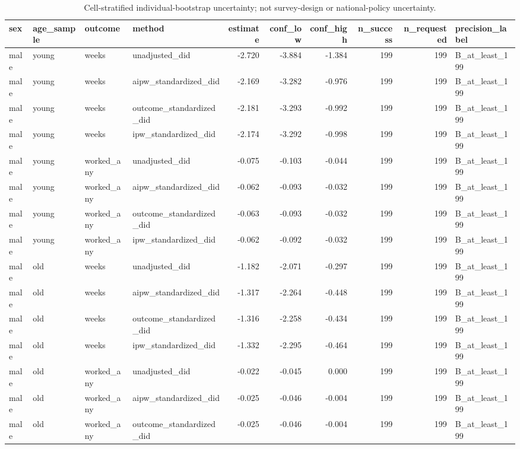 \begin{table}

\caption{Cell-stratified individual-bootstrap uncertainty; not survey-design or national-policy uncertainty.}
\centering
\begin{tabular}[t]{llllrrrrrl}
\toprule
sex & age\_sample & outcome & method & estimate & conf\_low & conf\_high & n\_success & n\_requested & precision\_label\\
\midrule
male & young & weeks & unadjusted\_did & -2.720 & -3.884 & -1.384 & 199 & 199 & B\_at\_least\_199\\
male & young & weeks & aipw\_standardized\_did & -2.169 & -3.282 & -0.976 & 199 & 199 & B\_at\_least\_199\\
male & young & weeks & outcome\_standardized\_did & -2.181 & -3.293 & -0.992 & 199 & 199 & B\_at\_least\_199\\
male & young & weeks & ipw\_standardized\_did & -2.174 & -3.292 & -0.998 & 199 & 199 & B\_at\_least\_199\\
male & young & worked\_any & unadjusted\_did & -0.075 & -0.103 & -0.044 & 199 & 199 & B\_at\_least\_199\\
\addlinespace
male & young & worked\_any & aipw\_standardized\_did & -0.062 & -0.093 & -0.032 & 199 & 199 & B\_at\_least\_199\\
male & young & worked\_any & outcome\_standardized\_did & -0.063 & -0.093 & -0.032 & 199 & 199 & B\_at\_least\_199\\
male & young & worked\_any & ipw\_standardized\_did & -0.062 & -0.092 & -0.032 & 199 & 199 & B\_at\_least\_199\\
male & old & weeks & unadjusted\_did & -1.182 & -2.071 & -0.297 & 199 & 199 & B\_at\_least\_199\\
male & old & weeks & aipw\_standardized\_did & -1.317 & -2.264 & -0.448 & 199 & 199 & B\_at\_least\_199\\
\addlinespace
male & old & weeks & outcome\_standardized\_did & -1.316 & -2.258 & -0.434 & 199 & 199 & B\_at\_least\_199\\
male & old & weeks & ipw\_standardized\_did & -1.332 & -2.295 & -0.464 & 199 & 199 & B\_at\_least\_199\\
male & old & worked\_any & unadjusted\_did & -0.022 & -0.045 & 0.000 & 199 & 199 & B\_at\_least\_199\\
male & old & worked\_any & aipw\_standardized\_did & -0.025 & -0.046 & -0.004 & 199 & 199 & B\_at\_least\_199\\
male & old & worked\_any & outcome\_standardized\_did & -0.025 & -0.046 & -0.004 & 199 & 199 & B\_at\_least\_199\\

\end{tabular}
\end{table}
